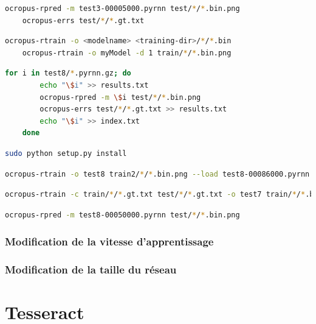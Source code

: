 \documentclass{report}
\begin{document}
\begin{lstlisting}[language=bash]
    ocropus-rpred -m test3-00005000.pyrnn test/*/*.bin.png
    ocropus-errs test/*/*.gt.txt
\end{lstlisting}

\begin{lstlisting}[language=bash]
    ocropus-rtrain -o <modelname> <training-dir>/*/*.bin
    ocropus-rtrain -o myModel -d 1 train/*/*.bin.png
\end{lstlisting}

\begin{lstlisting}[language=bash]
    for i in test8/*.pyrnn.gz; do
        echo "\$i" >> results.txt
        ocropus-rpred -m \$i test/*/*.bin.png
        ocropus-errs test/*/*.gt.txt >> results.txt
        echo "\$i" >> index.txt
    done
\end{lstlisting}

\begin{lstlisting}[language=bash]
    sudo python setup.py install
\end{lstlisting}

\begin{lstlisting}[language=bash]
    ocropus-rtrain -o test8 train2/*/*.bin.png --load test8-00086000.pyrnn
\end{lstlisting}

\begin{lstlisting}[language=bash]
    ocropus-rtrain -c train/*/*.gt.txt test/*/*.gt.txt -o test7 train/*/*.bin.png --load test7-00073000.pyrnn
\end{lstlisting}

\begin{lstlisting}[language=bash]
    ocropus-rpred -m test8-00050000.pyrnn test/*/*.bin.png
\end{lstlisting}

\subsubsection{Modification de la vitesse d'apprentissage}


\subsubsection{Modification de la taille du réseau}


\newpage

\section{Tesseract}
\end{document}
